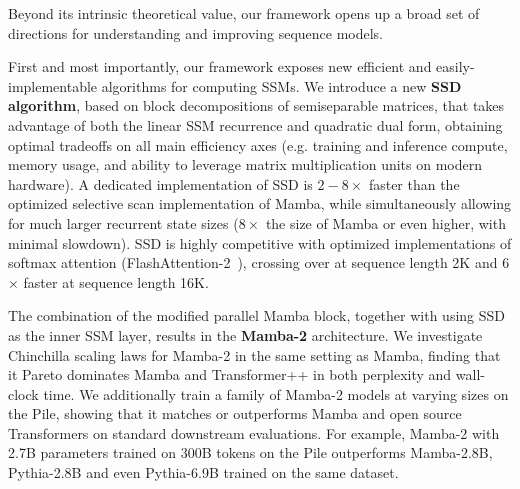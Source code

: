 Beyond its intrinsic theoretical value, our framework opens up a broad set of directions for understanding and improving sequence models.

First and most importantly, our framework exposes new efficient and easily-implementable algorithms for computing SSMs\iftoggle{arxiv}{ (\cref{sec:efficient})}{}.
We introduce a new \textbf{SSD algorithm}, based on block decompositions of semiseparable matrices, that takes advantage of both the linear SSM recurrence and quadratic dual form, obtaining optimal tradeoffs on all main efficiency axes (e.g. training and inference compute, memory usage, and ability to leverage matrix multiplication units on modern hardware).
A dedicated implementation of SSD is $2-8\times$ faster than the optimized selective scan implementation of Mamba, while simultaneously allowing for much larger recurrent state sizes ($8\times$ the size of Mamba or even higher, with minimal slowdown).
SSD is highly competitive with optimized implementations of softmax attention (FlashAttention-2~\citep{dao2023flashattention2}), crossing over at sequence length 2K and 6$\times$ faster at sequence length 16K.


\iftoggle{arxiv}{
\para{Architecture Design.}
One major obstacle to adopting new architectures such as SSMs is the ecosystem tailored to Transformers, such as hardware-efficient optimization and parallelism techniques for large-scale training.
Our framework allows using established conventions and techniques for attention to build a vocabulary of architecture design choices for SSMs, and further improve them (\cref{sec:architecture}).
For example, we introduce the analog of heads from multi-head attention (MHA) to SSMs.
We show that the Mamba architecture is a \textbf{multi-input SSM (MIS)} that turns out to be analogous to \textbf{multi-value attention (MVA)}, and compare other variants of Mamba with different head structures.

We also use these ideas to make slight modifications to the Mamba block, which allows tensor parallelism to be implemented (e.g. in the style of Megatron~\citep{shoeybi2019megatron}).
The main ideas include introducing grouped-value attention (GVA) head structure, and moving all data-dependent projections to occur in parallel at the beginning of the block.


}{
  \para{Mamba-2.}
  Additionally, inspired by the connection between SSMs and Transformers, we slightly modify the neural network architecture of Mamba by moving all data-dependent projections to occur in parallel at the beginning of the block. %
}
The combination of the modified parallel Mamba block, together with using SSD as the inner SSM layer, results in the \textbf{Mamba-2} architecture.
We investigate Chinchilla scaling laws for Mamba-2 in the same setting as Mamba, finding that it Pareto dominates Mamba and Transformer++ in both perplexity and wall-clock time.
We additionally train a family of Mamba-2 models at varying sizes on the Pile, showing that it matches or outperforms Mamba and open source Transformers on standard downstream evaluations.
For example, Mamba-2 with 2.7B parameters trained on 300B tokens on the Pile outperforms Mamba-2.8B, Pythia-2.8B and even Pythia-6.9B trained on the same dataset.

